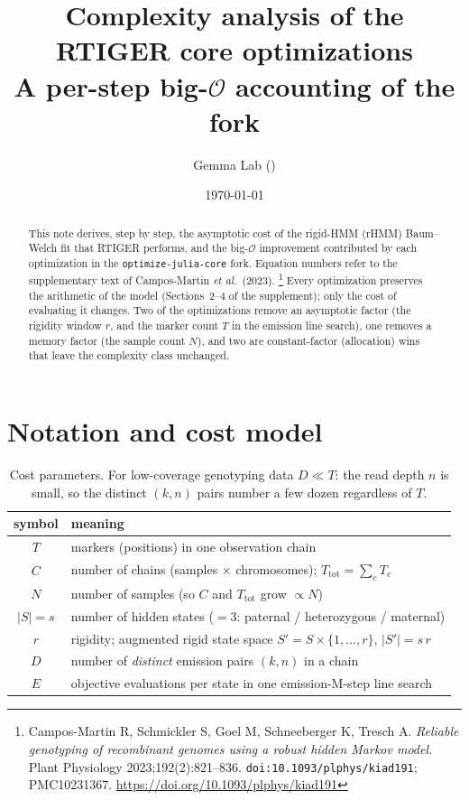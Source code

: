 \documentclass[11pt]{article}
\title{\textbf{Complexity analysis of the RTIGER core optimizations}\\[2pt]
\large A per-step big-$\mathcal{O}$ accounting of the \code{optimize-julia-core} fork}
\author{Gemma Lab (\code{faustovrz/RTIGER})}
\date{\today}
\newcommand{\bigO}{\mathcal{O}}
\newcommand{\states}{\lvert S\rvert}
\newcommand{\code}[1]{\texttt{#1}}
\begin{document}
\maketitle

\begin{abstract}
\noindent
This note derives, step by step, the asymptotic cost of the rigid-HMM (rHMM)
Baum--Welch fit that RTIGER performs, and the big-$\bigO$ improvement contributed
by each optimization in the \code{optimize-julia-core} fork. Equation numbers
refer to the supplementary text of Campos-Martin \emph{et al.}\ (2023).%
\footnote{Campos-Martin R, Schmickler S, Goel M, Schneeberger K, Tresch A.
\emph{Reliable genotyping of recombinant genomes using a robust hidden Markov
model.} Plant Physiology 2023;192(2):821--836.
\texttt{doi:10.1093/plphys/kiad191}; PMC10231367.
\url{https://doi.org/10.1093/plphys/kiad191}} Every optimization preserves the
arithmetic of the model (Sections~2--4 of the supplement); only the cost of
evaluating it changes. Two of the optimizations remove an asymptotic factor
(the rigidity window $r$, and the marker count $T$ in the emission line search),
one removes a memory factor (the sample count $N$), and two are
constant-factor (allocation) wins that leave the complexity class unchanged.
\end{abstract}

\section{Notation and cost model}

\begin{table}[h]
\centering
\begin{tabular}{c l}
\toprule
symbol & meaning \\
\midrule
$T$        & markers (positions) in one observation chain \\
$C$        & number of chains (samples $\times$ chromosomes); $T_{\text{tot}}=\sum_c T_c$ \\
$N$        & number of samples (so $C$ and $T_{\text{tot}}$ grow $\propto N$) \\
$\states=s$ & number of hidden states ($=3$: paternal / heterozygous / maternal) \\
$r$        & rigidity; augmented rigid state space $S'=S\times\{1,\dots,r\}$, $\lvert S'\rvert = s\,r$ \\
$D$        & number of \emph{distinct} emission pairs $(k,n)$ in a chain \\
$E$        & objective evaluations per state in one emission-M-step line search \\
\bottomrule
\end{tabular}
\caption{Cost parameters. For low-coverage genotyping data $D\ll T$: the read
depth $n$ is small, so the distinct $(k,n)$ pairs number a few dozen regardless
of $T$.}
\end{table}
\end{document}
